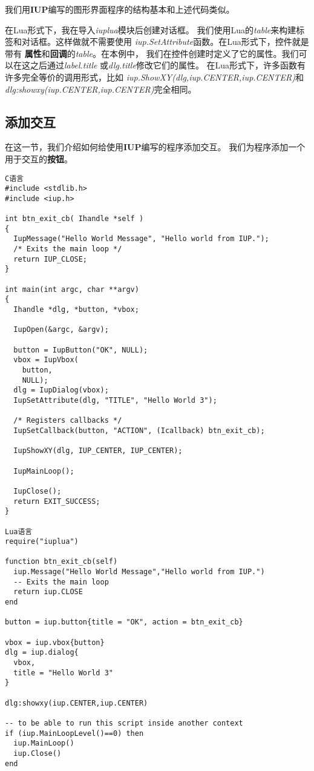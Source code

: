 \documentclass{ctexart}
\begin{document}
我们用\textbf{IUP}编写的图形界面程序的结构基本和上述代码类似。

在Lua形式下，我在导入\emph{iuplua}模块后创建对话框。
我们使用Lua的\emph{table}来构建标签和对话框。这样做就不需要使用
\emph{iup.SetAttribute}函数。在Lua形式下，控件就是带有
\textbf{属性}和\textbf{回调}的\emph{table}。在本例中，
我们在控件创建时定义了它的属性。我们可以在这之后通过\emph{label.title}
或\emph{dlg.title}修改它们的属性。
在Lua形式下，许多函数有许多完全等价的调用形式，比如
\emph{iup.ShowXY(dlg,iup.CENTER,iup.CENTER)}和
\emph{dlg:showxy(iup.CENTER,iup.CENTER)}完全相同。

\subsection{添加交互}

在这一节，我们介绍如何给使用\textbf{IUP}编写的程序添加交互。
我们为程序添加一个用于交互的\textbf{按钮}。

\lstset{language=C}
\begin{lstlisting}
C语言
#include <stdlib.h>
#include <iup.h>

int btn_exit_cb( Ihandle *self )
{
  IupMessage("Hello World Message", "Hello world from IUP.");
  /* Exits the main loop */
  return IUP_CLOSE;
}

int main(int argc, char **argv)
{
  Ihandle *dlg, *button, *vbox;

  IupOpen(&argc, &argv);
  
  button = IupButton("OK", NULL);
  vbox = IupVbox(
    button,
    NULL);
  dlg = IupDialog(vbox);
  IupSetAttribute(dlg, "TITLE", "Hello World 3");

  /* Registers callbacks */
  IupSetCallback(button, "ACTION", (Icallback) btn_exit_cb);

  IupShowXY(dlg, IUP_CENTER, IUP_CENTER);

  IupMainLoop();

  IupClose();
  return EXIT_SUCCESS;
}

Lua语言
require("iuplua")

function btn_exit_cb(self)
  iup.Message("Hello World Message","Hello world from IUP.")
  -- Exits the main loop
  return iup.CLOSE  
end

button = iup.button{title = "OK", action = btn_exit_cb}

vbox = iup.vbox{button}
dlg = iup.dialog{
  vbox,
  title = "Hello World 3"
}

dlg:showxy(iup.CENTER,iup.CENTER)

-- to be able to run this script inside another context
if (iup.MainLoopLevel()==0) then
  iup.MainLoop()
  iup.Close()
end
\end{lstlisting}
\end{document}
